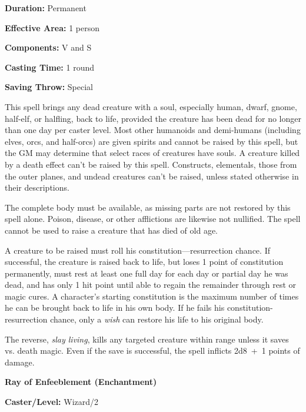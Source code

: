 \begin{multicols}{2}
\begin{minipage}{\columnwidth}
\noindent \textbf{Duration:} Permanent

\noindent \textbf{Effective Area:} 1 person

\noindent \textbf{Components:} V and S

\noindent \textbf{Casting Time:} 1 round

\noindent \textbf{Saving Throw:} Special

\end{minipage}

This spell brings any dead creature with a soul, especially human, dwarf, gnome, half-elf, or halfling, back to life, provided the creature has been dead for no longer than one day per caster level.  Most other humanoids and demi-humans (including elves, orcs, and half-orcs) are given spirits and cannot be raised by this spell, but the GM may determine that select races of creatures have souls.  A creature killed by a death effect can't be raised by this spell.  Constructs, elementals, those from the outer planes, and undead creatures can't be raised, unless stated otherwise in their descriptions.

The complete body must be available, as missing parts are not restored by this spell alone.  Poison, disease, or other afflictions are likewise not nullified.  The spell cannot be used to raise a creature that has died of old age.

A creature to be raised must roll his constitution---resurrection chance.  If successful, the creature is raised back to life, but loses 1 point of constitution permanently, must rest at least one full day for each day or partial day he was dead, and has only 1 hit point until able to regain the remainder through rest or magic cures.  A character's starting constitution is the maximum number of times he can be brought back to life in his own body.  If he fails his constitution-resurrection chance, only a \textit{wish} can restore his life to his original body.

The reverse, \textit{slay living}, kills any targeted creature within range unless it saves vs. death magic.  Even if the save is successful, the spell inflicts 2d8~+~1 points of damage.

\vspace{1em}

\noindent
\begin{minipage}{\columnwidth}

\noindent \textbf{Ray of Enfeeblement (Enchantment)}

\noindent \textbf{Caster/Level:} Wizard/2


\end{minipage}
\end{multicols}
